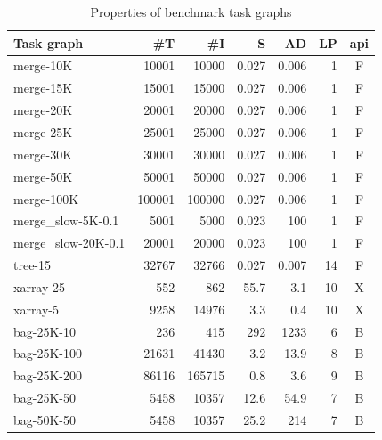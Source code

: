 \setlength{\tabcolsep}{5pt}
\begin{table}
	\caption{Properties of \dask{} benchmark task graphs}
	\centering
	\label{tab:dask-graph-properties}
	\begin{tabular}{l|rrrrrc}
		\toprule
		\textbf{Task graph} & \textbf{\#T} & \textbf{\#I}       & \textbf{S} &
		\textbf{AD}         & \textbf{LP}  & \textbf{\gls{api}}                               \\
		\midrule
		merge-10K           & 10001        & 10000              & 0.027      & 0.006 & 1  & F \\
		merge-15K           & 15001        & 15000              & 0.027      & 0.006 & 1  & F \\
		merge-20K           & 20001        & 20000              & 0.027      & 0.006 & 1  & F \\
		merge-25K           & 25001        & 25000              & 0.027      & 0.006 & 1  & F \\
		merge-30K           & 30001        & 30000              & 0.027      & 0.006 & 1  & F \\
		merge-50K           & 50001        & 50000              & 0.027      & 0.006 & 1  & F \\
		merge-100K          & 100001       & 100000             & 0.027      & 0.006 & 1  & F \\
		merge\_slow-5K-0.1  & 5001         & 5000               & 0.023      & 100   & 1  & F \\
		merge\_slow-20K-0.1 & 20001        & 20000              & 0.023      & 100   & 1  & F \\
		tree-15             & 32767        & 32766              & 0.027      & 0.007 & 14 & F \\
		xarray-25           & 552          & 862                & 55.7       & 3.1   & 10 & X \\
		xarray-5            & 9258         & 14976              & 3.3        & 0.4   & 10 & X \\
		bag-25K-10          & 236          & 415                & 292        & 1233  & 6  & B \\
		bag-25K-100         & 21631        & 41430              & 3.2        & 13.9  & 8  & B \\
		bag-25K-200         & 86116        & 165715             & 0.8        & 3.6   & 9  & B \\
		bag-25K-50          & 5458         & 10357              & 12.6       & 54.9  & 7  & B \\
		bag-50K-50          & 5458         & 10357              & 25.2       & 214   & 7  & B \\

\end{tabular}
\end{table}
